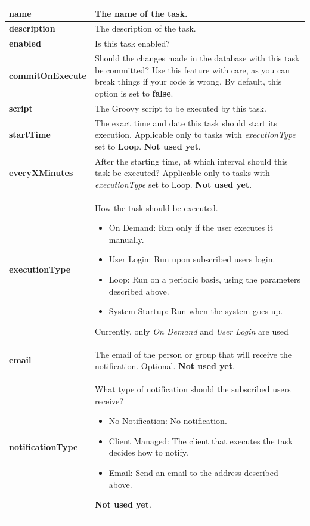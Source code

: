 \documentclass[a4paper]{article}
\begin{document}
		\begin{table}[h!]
			\centering
			\begin{tabular}{lp{10cm}}
				\textbf{name} & The name of the task. \\
				\midrule
				\textbf{description} & The description of the task. \\
				\midrule
				\textbf{enabled} & Is this task enabled? \\
				\midrule
				\textbf{commitOnExecute} & Should the changes made in the database with this task be committed? Use this feature with care, as you can break things if your code is wrong. By default, this option is set to \textbf{false}.\\
				\midrule
				\textbf{script} & The Groovy script to be executed by this task.\\
				\midrule
				\textbf{startTime} & The exact time and date this task should start its execution. Applicable only to tasks with \textit{executionType} set to \textbf{Loop}. 
				\textbf{Not used yet}. \\
				\midrule
				\textbf{everyXMinutes} & After the starting time, at which interval should this task be executed? Applicable only to tasks with \textit{executionType} set to Loop. \textbf{Not used yet}.\\
				\textbf{executionType} & How the task should be executed.
					\begin{itemize}
						\item On Demand: Run only if the user executes it manually.
						\item User Login: Run upon subscribed users login.
						\item Loop: Run on a periodic basis, using the parameters described above.
						\item System Startup: Run when the system goes up.
					\end{itemize}
					Currently, only \textit{On Demand} and \textit{User Login} are used\\
				\midrule
				\textbf{email} & The email of the person or group that will receive the notification. Optional. \textbf{Not used yet}.\\
				\midrule
				\textbf{notificationType} & What type of notification should the subscribed users receive?
					\begin{itemize}
						\item No Notification: No notification.
						\item Client Managed: The client that executes the task decides how to notify.
						\item Email: Send an email to the address described above.
					\end{itemize}
					\textbf{Not used yet}.
			\end{tabular}
		\end{table}
		
\end{document}
